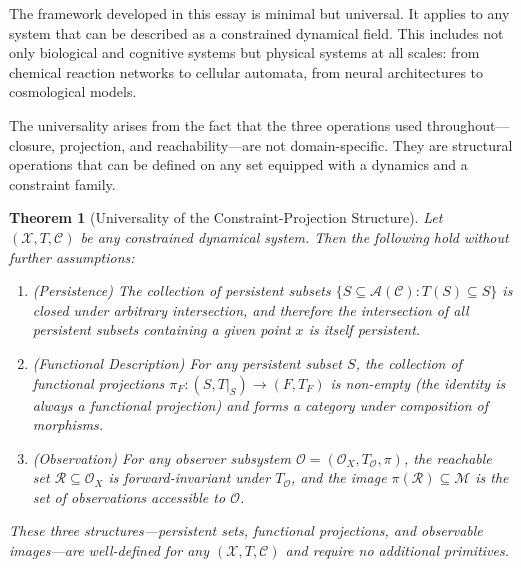 \documentclass[12pt, a4paper, oneside]{article}
\theoremstyle{plain}
\newtheorem{theorem}{Theorem}[section]
\theoremstyle{definition}
\theoremstyle{remark}
\newcommand{\X}{\mathcal{X}}
\newcommand{\C}{\mathcal{C}}
\newcommand{\M}{\mathcal{M}}
\newcommand{\Obs}{\mathcal{O}}
\newcommand{\R}{\mathcal{R}}
\newcommand{\A}{\mathcal{A}}
\newcommand{\T}{T}
\newcommand{\proj}{\pi}
\begin{document}
The framework developed in this essay is minimal but universal. It applies to any system that can be described as a constrained dynamical field. This includes not only biological and cognitive systems but physical systems at all scales: from chemical reaction networks to cellular automata, from neural architectures to cosmological models.

The universality arises from the fact that the three operations used throughout---closure, projection, and reachability---are not domain-specific. They are structural operations that can be defined on any set equipped with a dynamics and a constraint family.

\begin{theorem}[Universality of the Constraint-Projection Structure]
\label{thm:universality}
Let $(\X, \T, \C)$ be any constrained dynamical system. Then the following hold without further assumptions:

\begin{enumerate}
\item \emph{(Persistence)} The collection of persistent subsets $\{S \subseteq \A(\C) : \T(S) \subseteq S\}$ is closed under arbitrary intersection, and therefore the intersection of all persistent subsets containing a given point $x$ is itself persistent.

\item \emph{(Functional Description)} For any persistent subset $S$, the collection of functional projections $\proj_F : (S, \T|_S) \to (F, \T_F)$ is non-empty (the identity is always a functional projection) and forms a category under composition of morphisms.

\item \emph{(Observation)} For any observer subsystem $\Obs = (\Obs_X, \T_\Obs, \proj)$, the reachable set $\R \subseteq \Obs_X$ is forward-invariant under $\T_\Obs$, and the image $\proj(\R) \subseteq \M$ is the set of observations accessible to $\Obs$.
\end{enumerate}

These three structures---persistent sets, functional projections, and observable images---are well-defined for any $(\X, \T, \C)$ and require no additional primitives.
\end{theorem}
\end{document}
